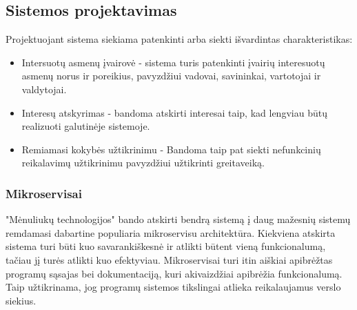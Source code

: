 \documentclass{VUMIFPSkursinis}
\begin{document}
	\subsection{Sistemos projektavimas}
	Projektuojant sistema siekiama patenkinti arba siekti išvardintas charakteristikas:
	\begin{itemize}
		\item{
			Intersuotų asmenų įvairovė - sistema turis patenkinti įvairių interesuotų asmenų norus ir poreikius, pavyzdžiui vadovai, savininkai, vartotojai ir valdytojai.
		}
		\item{Interesų atskyrimas - bandoma atskirti interesai taip, kad lengviau būtų realizuoti galutinėje sistemoje.  }
		\item{Remiamasi kokybės užtikrinimu - Bandoma taip pat siekti nefunkcinių reikalavimų užtikrinimu pavyzdžiui užtikrinti greitaveiką.}
	\end{itemize}
	\subsubsection{Mikroservisai}
	"Mėnuliukų technologijos" bando atskirti bendrą sistemą į daug mažesnių sistemų remdamasi dabartine populiaria mikroservisu architektūra.
	Kiekviena atskirta sistema turi būti kuo savarankiškesnė ir atlikti būtent vieną funkcionalumą, tačiau jį turės atlikti kuo efektyviau.
	Mikroservisai turi itin aiškiai apibrėžtas programų sąsajas bei dokumentaciją, kuri akivaizdžiai apibrėžia funkcionalumą.
	Taip užtikrinama, jog programų sistemos tikslingai atlieka reikalaujamus verslo siekius.
\end{document}
